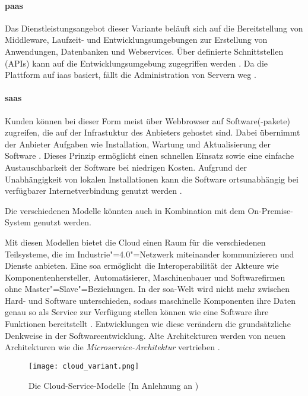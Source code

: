 \paragraph{\ac{paas}} Das Dienstleistungsangebot dieser Variante beläuft sich auf die Bereitstellung von Middleware, Laufzeit- und Entwicklungsumgebungen zur Erstellung von Anwendungen, Datenbanken und Webservices. Über definierte Schnittstellen (APIs) kann auf die Entwicklungsumgebung zugegriffen werden \citep{Dzombeta2017}. Da die Plattform auf \ac{iaas} basiert, fällt die Administration von Servern weg \citep{Acharya2019}.

\paragraph{\ac{saas}} Kunden können bei dieser Form meist über Webbrowser auf Software(-pakete) zugreifen, die auf der Infrastuktur des Anbieters gehostet sind. Dabei übernimmt der Anbieter Aufgaben wie Installation, Wartung und Aktualisierung der Software \citep{Utecht2018}. Dieses Prinzip ermöglicht einen schnellen Einsatz sowie eine einfache Austauschbarkeit der Software bei niedrigen Kosten. Aufgrund der Unabhängigkeit von lokalen Installationen kann die Software ortsunabhängig bei verfügbarer Internetverbindung genutzt werden \citep{Dzombeta2017}.

\vspace{0.5cm}
\noindent Die verschiedenen Modelle könnten auch in Kombination mit dem On-Premise-System genutzt werden.

\noindent Mit diesen Modellen bietet die Cloud einen Raum für die verschiedenen Teilsysteme, die im Industrie"=4.0"=Netzwerk miteinander kommunizieren und Dienste anbieten. Eine \acf{soa} ermöglicht die Interoperabilität der Akteure wie Komponentenhersteller, Automatisierer, Maschinenbauer und Softwarefirmen ohne Master"=Slave"=Beziehungen. In der \ac{soa}-Welt wird nicht mehr zwischen Hard- und Software unterschieden, sodass maschinelle Komponenten ihre Daten genau so als Service zur Verfügung stellen können wie eine Software ihre Funktionen bereitstellt \citep{Adolphs2017}. Entwicklungen wie diese verändern die grundsätzliche Denkweise in der Softwareentwicklung. Alte Architekturen werden von neuen Architekturen wie die \textit{Microservice-Architektur} vertrieben \citep{Acharya2019}.

\begin{figure}[]
  \centering
  \texttt{[image: cloud\_variant.png]}
  \caption[Die Cloud-Service-Modelle]{Die Cloud-Service-Modelle (In Anlehnung an \citet[S. 88]{Utecht2018})}
  \label{}
\end{figure}

